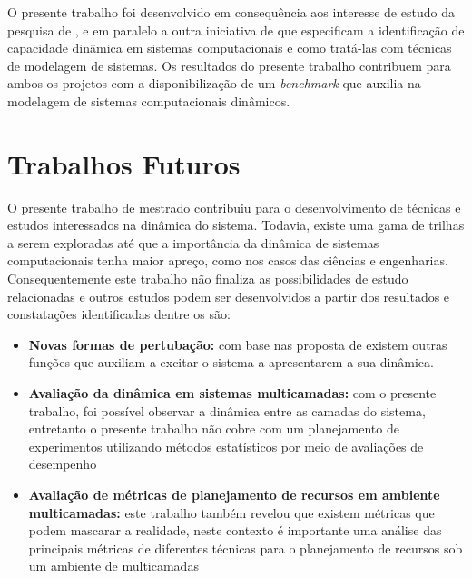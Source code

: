 O presente trabalho foi desenvolvido em consequência aos interesse de estudo da pesquisa de , e em paralelo a outra iniciativa de  que especificam a identificação de capacidade dinâmica em sistemas computacionais e como tratá-las com técnicas de modelagem de sistemas. Os resultados do presente trabalho contribuem para ambos os projetos com a disponibilização de um \textit{benchmark} que auxilia na modelagem de sistemas computacionais dinâmicos.

\section{Trabalhos Futuros}
O presente trabalho de mestrado contribuiu para o desenvolvimento de técnicas e estudos interessados na dinâmica do sistema. Todavia, existe uma gama de trilhas a serem exploradas até que a importância da dinâmica de sistemas computacionais tenha maior apreço, como nos casos das ciências e engenharias. Consequentemente este trabalho não finaliza as possibilidades de estudo relacionadas e outros estudos podem ser desenvolvidos a partir dos resultados e constatações identificadas dentre os são:
\begin{itemize}
	\item \textbf{Novas formas de pertubação:} com base nas proposta de \cite{Hellerstein2004} existem outras funções que auxiliam a excitar o sistema a apresentarem a sua dinâmica. 
	
	\item \textbf{Avaliação da dinâmica em sistemas multicamadas:} com o presente trabalho, foi possível observar a dinâmica entre as camadas do sistema, entretanto o presente trabalho não cobre com um planejamento de experimentos utilizando métodos estatísticos por meio de avaliações de desempenho
	
	\item \textbf{Avaliação de métricas de planejamento de recursos em ambiente multicamadas:} este trabalho também revelou que existem métricas que podem mascarar a realidade, neste contexto é importante uma análise das principais métricas de diferentes técnicas para o planejamento de recursos sob um ambiente de multicamadas
\end{itemize} 	
